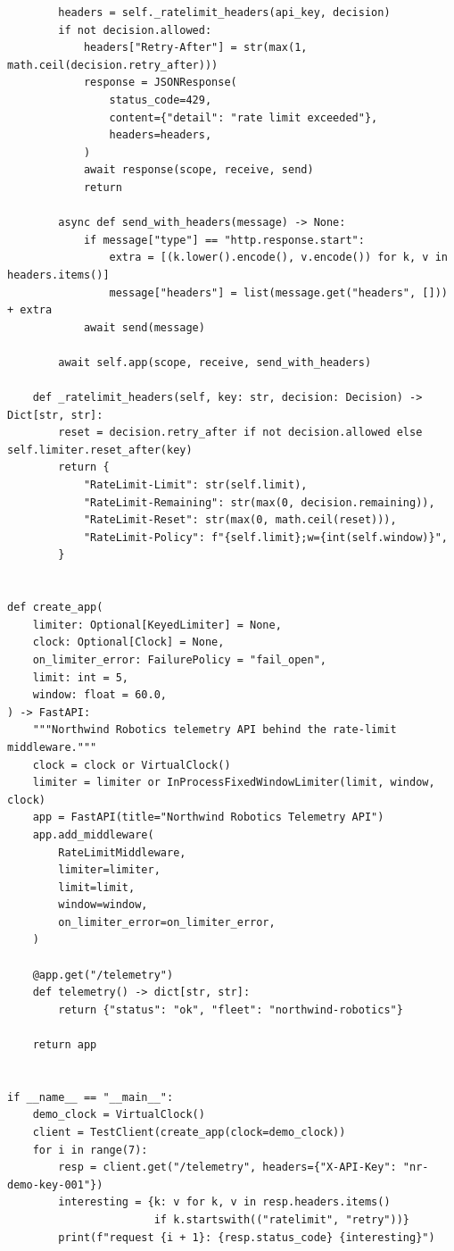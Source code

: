 \begin{verbatim}
        headers = self._ratelimit_headers(api_key, decision)
        if not decision.allowed:
            headers["Retry-After"] = str(max(1, math.ceil(decision.retry_after)))
            response = JSONResponse(
                status_code=429,
                content={"detail": "rate limit exceeded"},
                headers=headers,
            )
            await response(scope, receive, send)
            return

        async def send_with_headers(message) -> None:
            if message["type"] == "http.response.start":
                extra = [(k.lower().encode(), v.encode()) for k, v in headers.items()]
                message["headers"] = list(message.get("headers", [])) + extra
            await send(message)

        await self.app(scope, receive, send_with_headers)

    def _ratelimit_headers(self, key: str, decision: Decision) -> Dict[str, str]:
        reset = decision.retry_after if not decision.allowed else self.limiter.reset_after(key)
        return {
            "RateLimit-Limit": str(self.limit),
            "RateLimit-Remaining": str(max(0, decision.remaining)),
            "RateLimit-Reset": str(max(0, math.ceil(reset))),
            "RateLimit-Policy": f"{self.limit};w={int(self.window)}",
        }


def create_app(
    limiter: Optional[KeyedLimiter] = None,
    clock: Optional[Clock] = None,
    on_limiter_error: FailurePolicy = "fail_open",
    limit: int = 5,
    window: float = 60.0,
) -> FastAPI:
    """Northwind Robotics telemetry API behind the rate-limit middleware."""
    clock = clock or VirtualClock()
    limiter = limiter or InProcessFixedWindowLimiter(limit, window, clock)
    app = FastAPI(title="Northwind Robotics Telemetry API")
    app.add_middleware(
        RateLimitMiddleware,
        limiter=limiter,
        limit=limit,
        window=window,
        on_limiter_error=on_limiter_error,
    )

    @app.get("/telemetry")
    def telemetry() -> dict[str, str]:
        return {"status": "ok", "fleet": "northwind-robotics"}

    return app


if __name__ == "__main__":
    demo_clock = VirtualClock()
    client = TestClient(create_app(clock=demo_clock))
    for i in range(7):
        resp = client.get("/telemetry", headers={"X-API-Key": "nr-demo-key-001"})
        interesting = {k: v for k, v in resp.headers.items()
                       if k.startswith(("ratelimit", "retry"))}
        print(f"request {i + 1}: {resp.status_code} {interesting}")
\end{verbatim}

